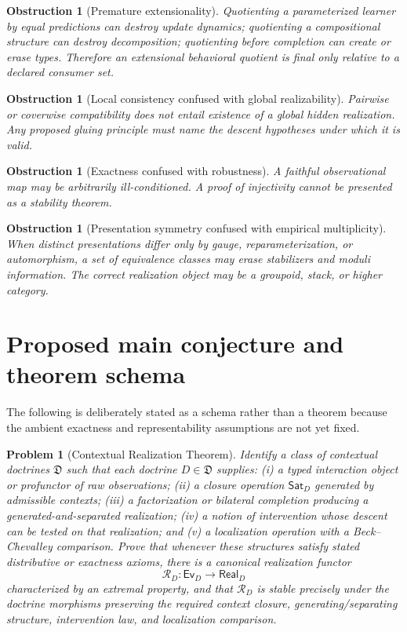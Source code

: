 \documentclass[11pt]{article}
\newtheorem{problem}[theorem]{Problem}
\newtheorem{obstruction}[theorem]{Obstruction}
\theoremstyle{definition}
\theoremstyle{remark}
\newcommand{\Ev}{\mathsf{Ev}}
\newcommand{\Sat}{\mathsf{Sat}}
\begin{document}
\begin{obstruction}[Premature extensionality]
Quotienting a parameterized learner by equal predictions can destroy update dynamics; quotienting a compositional structure can destroy decomposition; quotienting before completion can create or erase types. Therefore an extensional behavioral quotient is final only relative to a declared consumer set.
\end{obstruction}

\begin{obstruction}[Local consistency confused with global realizability]
Pairwise or coverwise compatibility does not entail existence of a global hidden realization. Any proposed gluing principle must name the descent hypotheses under which it is valid.
\end{obstruction}

\begin{obstruction}[Exactness confused with robustness]
A faithful observational map may be arbitrarily ill-conditioned. A proof of injectivity cannot be presented as a stability theorem.
\end{obstruction}

\begin{obstruction}[Presentation symmetry confused with empirical multiplicity]
When distinct presentations differ only by gauge, reparameterization, or automorphism, a set of equivalence classes may erase stabilizers and moduli information. The correct realization object may be a groupoid, stack, or higher category.
\end{obstruction}

\section{Proposed main conjecture and theorem schema}

The following is deliberately stated as a schema rather than a theorem because the ambient exactness and representability assumptions are not yet fixed.

\begin{problem}[Contextual Realization Theorem]
Identify a class of contextual doctrines $\mathfrak D$ such that each doctrine $D\in\mathfrak D$ supplies: (i) a typed interaction object or profunctor of raw observations; (ii) a closure operation $\Sat_D$ generated by admissible contexts; (iii) a factorization or bilateral completion producing a generated-and-separated realization; (iv) a notion of intervention whose descent can be tested on that realization; and (v) a localization operation with a Beck--Chevalley comparison. Prove that whenever these structures satisfy stated distributive or exactness axioms, there is a canonical realization functor
\[
\mathcal R_D:\Ev_D\longrightarrow \mathsf{Real}_D
\]
characterized by an extremal property, and that $\mathcal R_D$ is stable precisely under the doctrine morphisms preserving the required context closure, generating/separating structure, intervention law, and localization comparison.
\end{problem}
\end{document}
